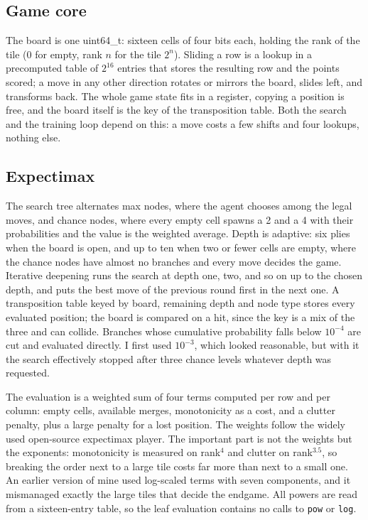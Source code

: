 \documentclass[conference]{IEEEtran}
\begin{document}
\subsection{Game core}
The board is one uint64\_t: sixteen cells of four bits each, holding the rank of the tile ($0$ for empty, rank $n$ for the tile $2^n$). Sliding a row is a lookup in a precomputed table of $2^{16}$ entries that stores the resulting row and the points scored; a move in any other direction rotates or mirrors the board, slides left, and transforms back. The whole game state fits in a register, copying a position is free, and the board itself is the key of the transposition table. Both the search and the training loop depend on this: a move costs a few shifts and four lookups, nothing else.

\subsection{Expectimax}
The search tree alternates max nodes, where the agent chooses among the legal moves, and chance nodes, where every empty cell spawns a 2 and a 4 with their probabilities and the value is the weighted average\cite{b3}. Depth is adaptive: six plies when the board is open, and up to ten when two or fewer cells are empty, where the chance nodes have almost no branches and every move decides the game. Iterative deepening runs the search at depth one, two, and so on up to the chosen depth, and puts the best move of the previous round first in the next one. A transposition table keyed by board, remaining depth and node type stores every evaluated position; the board is compared on a hit, since the key is a mix of the three and can collide. Branches whose cumulative probability falls below $10^{-4}$ are cut and evaluated directly. I first used $10^{-3}$, which looked reasonable, but with it the search effectively stopped after three chance levels whatever depth was requested.

The evaluation is a weighted sum of four terms computed per row and per column: empty cells, available merges, monotonicity as a cost, and a clutter penalty, plus a large penalty for a lost position. The weights follow the widely used open-source expectimax player\cite{b4}. The important part is not the weights but the exponents: monotonicity is measured on rank$^4$ and clutter on rank$^{3.5}$, so breaking the order next to a large tile costs far more than next to a small one. An earlier version of mine used log-scaled terms with seven components, and it mismanaged exactly the large tiles that decide the endgame. All powers are read from a sixteen-entry table, so the leaf evaluation contains no calls to \texttt{pow} or \texttt{log}.
\end{document}

